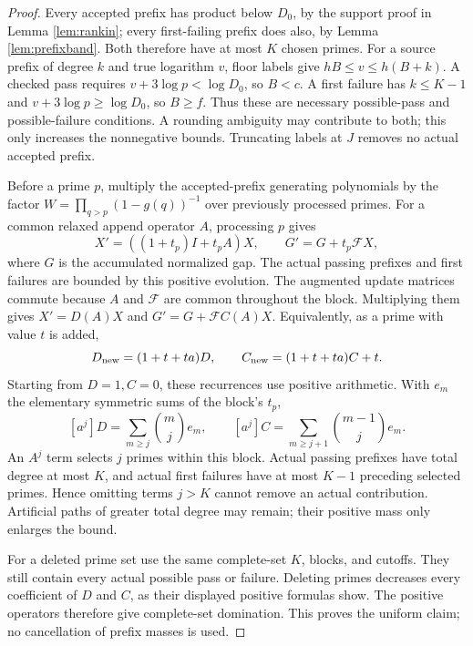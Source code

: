 \documentclass[11pt]{article}
\begin{document}
\begin{proof}
Every accepted prefix has product below $D_0$, by the support proof
in Lemma \ref{lem:rankin}; every first-failing prefix does also,
by Lemma \ref{lem:prefixband}. Both therefore have at most $K$
chosen primes. For a source prefix of degree $k$ and true logarithm
$v$, floor labels give $hB\le v\le h(B+k)$.
A checked pass requires $v+3\log p<\log D_0$, so $B<c$.
A first failure has $k\le K-1$ and
$v+3\log p\ge\log D_0$, so $B\ge f$.
Thus these are necessary possible-pass and possible-failure
conditions. A rounding ambiguity may contribute to both; this only
increases the nonnegative bounds. Truncating labels at $J$ removes
no actual accepted prefix.

Before a prime $p$, multiply the accepted-prefix generating
polynomials by the factor
$W=\prod_{q>p}(1-g(q))^{-1}$ over previously processed primes.
For a common relaxed append operator $A$, processing $p$ gives
\[
X'=((1+t_p)I+t_pA)X,\qquad
G'=G+t_p\mathcal FX,
\]
where $G$ is the accumulated normalized gap.
The actual passing prefixes and first failures are bounded by this
positive evolution. The augmented update matrices commute because
$A$ and $\mathcal F$ are common throughout the block. Multiplying
them gives $X'=D(A)X$ and
$G'=G+\mathcal FC(A)X$.
Equivalently, as a prime with value $t$ is added,
\[
D_{\rm new}=(1+t+ta)D,\qquad
C_{\rm new}=(1+t+ta)C+t.
\]
Starting from $D=1,C=0$, these recurrences use positive arithmetic.
With $e_m$ the elementary symmetric sums of the block's $t_p$,
\[
[a^j]D=\sum_{m\ge j}\binom mj e_m,\qquad
[a^j]C=\sum_{m\ge j+1}\binom{m-1}j e_m.
\]
An $A^j$ term selects $j$ primes within this block. Actual
passing prefixes have total degree at most $K$, and actual first
failures have at most $K-1$ preceding selected primes. Hence
omitting terms $j>K$ cannot remove an actual contribution.
Artificial paths of greater total degree may remain; their positive
mass only enlarges the bound.

For a deleted prime set use the same complete-set $K$, blocks,
and cutoffs. They still contain every actual possible pass or failure.
Deleting primes decreases every coefficient of $D$ and $C$,
as their displayed positive formulas show. The positive operators
therefore give complete-set domination. This proves the uniform
claim; no cancellation of prefix masses is used.
\end{proof}
\end{document}
